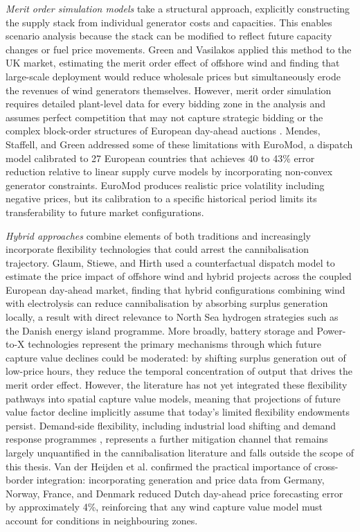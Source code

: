 \textit{Merit order simulation models} take a structural approach, explicitly constructing the supply stack from individual generator costs and capacities. This enables scenario analysis because the stack can be modified to reflect future capacity changes or fuel price movements. Green and Vasilakos \cite{GreenVasilakos2011} applied this method to the UK market, estimating the merit order effect of offshore wind and finding that large-scale deployment would reduce wholesale prices but simultaneously erode the revenues of wind generators themselves. However, merit order simulation requires detailed plant-level data for every bidding zone in the analysis and assumes perfect competition that may not capture strategic bidding or the complex block-order structures of European day-ahead auctions \cite{Weron2014, Mays2023}. Mendes, Staffell, and Green \cite{Mendes2024} addressed some of these limitations with EuroMod, a dispatch model calibrated to 27 European countries that achieves 40 to 43\% error reduction relative to linear supply curve models by incorporating non-convex generator constraints. EuroMod produces realistic price volatility including negative prices, but its calibration to a specific historical period limits its transferability to future market configurations.

\vspace{4pt}

\textit{Hybrid approaches} combine elements of both traditions and increasingly incorporate flexibility technologies that could arrest the cannibalisation trajectory. Glaum, Stiewe, and Hirth \cite{OffshoreHybrids2024} used a counterfactual dispatch model to estimate the price impact of offshore wind and hybrid projects across the coupled European day-ahead market, finding that hybrid configurations combining wind with electrolysis can reduce cannibalisation by absorbing surplus generation locally, a result with direct relevance to North Sea hydrogen strategies such as the Danish energy island programme. More broadly, battery storage and Power-to-X technologies represent the primary mechanisms through which future capture value declines could be moderated: by shifting surplus generation out of low-price hours, they reduce the temporal concentration of output that drives the merit order effect. However, the literature has not yet integrated these flexibility pathways into spatial capture value models, meaning that projections of future value factor decline implicitly assume that today's limited flexibility endowments persist. Demand-side flexibility, including industrial load shifting and demand response programmes \cite{Hirth2015}, represents a further mitigation channel that remains largely unquantified in the cannibalisation literature and falls outside the scope of this thesis. Van der Heijden et al. \cite{VanDerHeijden2021} confirmed the practical importance of cross-border integration: incorporating generation and price data from Germany, Norway, France, and Denmark reduced Dutch day-ahead price forecasting error by approximately 4\%, reinforcing that any wind capture value model must account for conditions in neighbouring zones.

